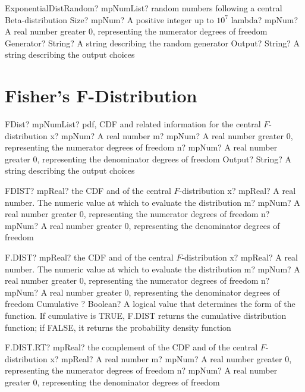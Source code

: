 \documentclass[12pt,a4paper,openany]{book}
\begin{document}
\begin{mpFunctionsExtract}
\mpFunctionFourNotImplemented
{ExponentialDistRandom? mpNumList? random numbers following a central Beta-distribution}
{Size? mpNum? A positive integer up to $10^7$}
{lambda? mpNum? A real number greater 0, representing the numerator  degrees of freedom}
{Generator? String? A string describing the random generator}
{Output? String? A string describing the output choices}
\end{mpFunctionsExtract}

\section{Fisher's F-Distribution}

\begin{mpFunctionsExtract}
\mpFunctionFourNotImplemented
{FDist? mpNumList? pdf, CDF and related information for the central $F$-distribution}
{x? mpNum? A real number}
{m? mpNum? A real number greater 0, representing the numerator  degrees of freedom}
{n? mpNum? A real number greater 0, representing the denominator degrees of freedom}
{Output? String? A string describing the output choices}
\end{mpFunctionsExtract}

\begin{mpFunctionsExtract}
\mpWorksheetFunctionThreeNotImplemented
{FDIST? mpReal? the CDF and of the central $F$-distribution}
{x? mpReal? A real number. The numeric value at which to evaluate the distribution}
{m? mpNum? A real number greater 0, representing the numerator  degrees of freedom}
{n? mpNum? A real number greater 0, representing the denominator degrees of freedom}
\end{mpFunctionsExtract}

\begin{mpFunctionsExtract}
\mpWorksheetFunctionFourNotImplemented
{F.DIST? mpReal? the CDF and of the central $F$-distribution}
{x? mpReal? A real number. The numeric value at which to evaluate the distribution}
{m? mpNum? A real number greater 0, representing the numerator  degrees of freedom}
{n? mpNum? A real number greater 0, representing the denominator degrees of freedom}
{Cumulative ? Boolean? A logical value that determines the form of the function. If cumulative is TRUE, F.DIST returns the cumulative distribution function; if FALSE, it returns the probability density function}
\end{mpFunctionsExtract}

\begin{mpFunctionsExtract}
\mpWorksheetFunctionThreeNotImplemented
{F.DIST.RT? mpReal? the complement of the CDF and of the central $F$-distribution}
{x? mpReal? A real number}
{m? mpNum? A real number greater 0, representing the numerator  degrees of freedom}
{n? mpNum? A real number greater 0, representing the denominator degrees of freedom}
\end{mpFunctionsExtract}
\end{document}
